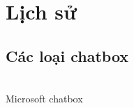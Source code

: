%
\chapter{Lịch sử}
\label{sec:intro}


\section{Các loại chatbox} \\[0.2em]
\label{sec:intro:history}
Microsoft chatbox





